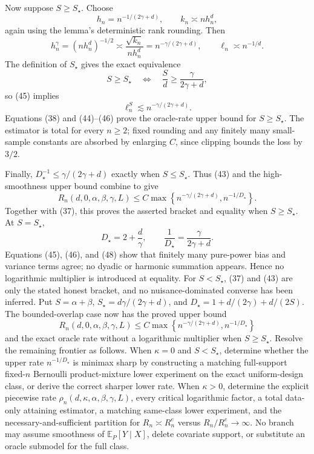 Now suppose \(S\geq S_\star\).  Choose
\[
 h_n=n^{-1/(2\gamma+d)},
 \qquad
 k_n\asymp nh_n^d,
 \tag{44}
\]
again using the lemma's deterministic rank rounding.  Then
\[
 h_n^\gamma=(nh_n^d)^{-1/2}\asymp\frac{\sqrt{k_n}}{nh_n^d}
 =n^{-\gamma/(2\gamma+d)},
 \qquad
 \ell_n\asymp n^{-1/d}.
 \tag{45}
\]
The definition of \(S_\star\) gives the exact equivalence
\[
 S\geq S_\star
 \quad\Longleftrightarrow\quad
 \frac Sd\geq\frac\gamma{2\gamma+d},
\]
so (45) implies
\[
 \ell_n^S\lesssim n^{-\gamma/(2\gamma+d)}.
 \tag{46}
\]
Equations (38) and (44)--(46) prove the oracle-rate upper bound for \(S\geq S_\star\).  The estimator is total for every \(n\geq2\); fixed rounding and any finitely many small-sample constants are absorbed by enlarging \(C\), since clipping bounds the loss by \(3/2\).

Finally, \(D_\star^{-1}\leq\gamma/(2\gamma+d)\) exactly when \(S\leq S_\star\).  Thus (43) and the high-smoothness upper bound combine to give
\[
 R_n(d,0,\alpha,\beta,\gamma,L)
 \leq C\max\left\{n^{-\gamma/(2\gamma+d)},n^{-1/D_\star}\right\}.
 \tag{47}
\]
Together with (37), this proves the asserted bracket and equality when \(S\geq S_\star\).  At \(S=S_\star\),
\[
 D_\star=2+\frac d\gamma,
 \qquad
 \frac1{D_\star}=\frac\gamma{2\gamma+d}.
 \tag{48}
\]
Equations (45), (46), and (48) show that finitely many pure-power bias and variance terms agree; no dyadic or harmonic summation appears.  Hence no logarithmic multiplier is introduced at equality.  For \(S<S_\star\), (37) and (43) are only the stated honest bracket, and no nuisance-dominated converse has been inferred.
Put \(S=\alpha+\beta\), \(S_\star=d\gamma/(2\gamma+d)\), and \(D_\star=1+d/(2\gamma)+d/(2S)\).  The bounded-overlap case now has the proved upper bound
\[
 R_n(d,0,\alpha,\beta,\gamma,L)
 \leq C\max\left\{n^{-\gamma/(2\gamma+d)},n^{-1/D_\star}\right\}
\]
and the exact oracle rate without a logarithmic multiplier when \(S\geq S_\star\).  Resolve the remaining frontier as follows.  When \(\kappa=0\) and \(S<S_\star\), determine whether the upper rate \(n^{-1/D_\star}\) is minimax sharp by constructing a matching full-support fixed-\(n\) Bernoulli product-mixture lower experiment on the exact uniform-design class, or derive the correct sharper lower rate.  When \(\kappa>0\), determine the explicit piecewise rate \(\rho_n(d,\kappa,\alpha,\beta,\gamma,L)\), every critical logarithmic factor, a total data-only attaining estimator, a matching same-class lower experiment, and the necessary-and-sufficient partition for \(R_n\asymp R_n^e\) versus \(R_n/R_n^e\to\infty\).  No branch may assume smoothness of \(\mathbb E_P[Y\mid X]\), delete covariate support, or substitute an oracle submodel for the full class.
